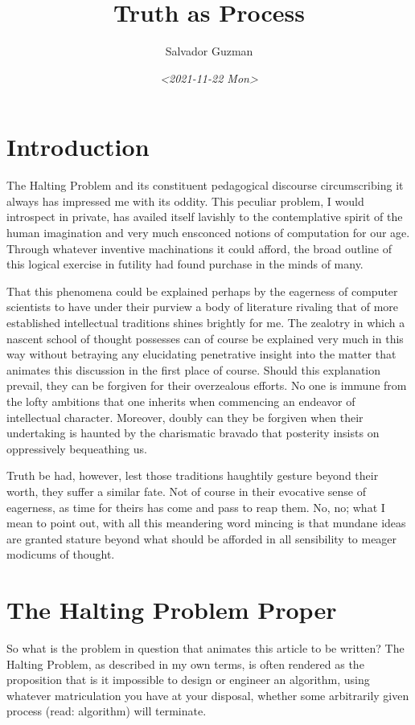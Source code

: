 \documentclass[11pt]{article}
\author{Salvador Guzman}
\date{\textit{<2021-11-22 Mon>}}
\title{Truth as Process}
\begin{document}
\maketitle
\tableofcontents


\section{Introduction}
\label{sec:orge66d11b}

The Halting Problem and its constituent pedagogical discourse circumscribing
it always has impressed me with its oddity. This peculiar problem, I would
introspect in private, has availed itself lavishly to the contemplative spirit
of the human imagination and very much ensconced notions of computation for
our age. Through whatever inventive machinations it could afford, the broad
outline of this logical exercise in futility had found purchase in the minds
of many.

That this phenomena could be explained perhaps by the eagerness of computer
scientists to have under their purview a body of literature rivaling that of
more established intellectual traditions shines brightly for me. The zealotry
in which a nascent school of thought possesses can of course be explained very
much in this way without betraying any elucidating penetrative insight into
the matter that animates this discussion in the first place of course. Should
this explanation prevail, they can be forgiven for their overzealous efforts.
No one is immune from the lofty ambitions that one inherits when commencing an
endeavor of intellectual character. Moreover, doubly can they be forgiven when
their undertaking is haunted by the charismatic bravado that posterity insists
on oppressively bequeathing us.

Truth be had, however, lest those traditions haughtily gesture beyond their
worth, they suffer a similar fate. Not of course in their evocative sense of
eagerness, as time for theirs has come and pass to reap them. No, no; what I
mean to point out, with all this meandering word mincing is that mundane ideas
are granted stature beyond what should be afforded in all sensibility to
meager modicums of thought.

\section{The Halting Problem Proper}
\label{sec:org6782221}
So what is the problem in question that animates this article to be written?
The Halting Problem, as described in my own terms, is often rendered as the
proposition that is it impossible to design or engineer an algorithm, using
whatever matriculation you have at your disposal, whether some arbitrarily
given process (read: algorithm) will terminate.
\end{document}

